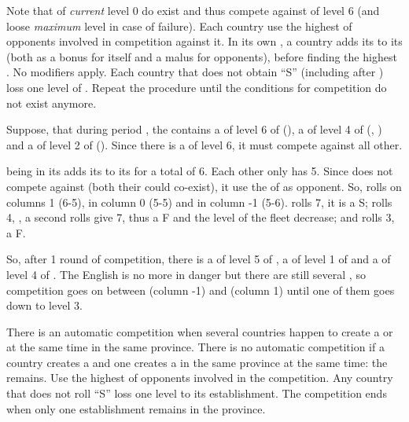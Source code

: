 
\bparag Note that \TradeFLEET of \emph{current} level 0 do exist and thus
compete against \TradeFLEET of level 6 (and loose \emph{maximum} level in case
of failure).
\bparag Each country use the highest \FTI of opponents involved in competition
against it.
\bparag In its own \CTZ, a country adds its \DTI to its \FTI (both as a bonus
for itself and a malus for opponents), before finding the highest \FTI.
\bparag No modifiers apply.
\bparag Each country that does not obtain ``S'' (including after \undemi) loss
one level of \TradeFLEET.
\bparag Repeat the procedure until the conditions for competition do not exist
anymore.

\begin{exemple}
  Suppose, that during period , the  contains a
  \TradeFLEET of level 6 of \HOL (), a \TradeFLEET of level 4 of \FRA
  (, ) and a \TradeFLEET of level 2 of \ANG (). Since there
  is a \TradeFLEET of level 6, it must compete against all other.

  \FRA being in its \CTZ adds its \DTI to its \FTI for a total of 6. Each
  other only has 5. Since \ANG does not compete against \FRA (both their
  \TradeFLEET could co-exist), it use the \FTI of \HOL as opponent. So, \FRA
  rolls on columns 1 (6-5), \ANG in column 0 (5-5) and \HOL in column -1
  (5-6). \FRA rolls 7, it is a S; \ANG rolls 4, \undemi, a second rolls give
  7, thus a F and the level of the fleet decrease; and \HOL rolls 3, a F.

  So, after 1 round of competition, there is a \TradeFLEET of level 5 of \HOL,
  a \TradeFLEET of level 1 of \ANG and a \TradeFLEET of level 4 of \FRA. The
  English \TradeFLEET is no more in danger but there are still several
  \TradeFLEET\Faceplus, so competition goes on between \HOL (column -1) and
  \FRA (column 1) until one of them goes down to level 3.
\end{exemple}

 There is an automatic competition when
several countries happen to create a \COL or \TP at the same time in the same
province.
\bparag There is no automatic competition if a country creates a \COL and one
creates a \TP in the same province at the same time: the \COL remains.
\bparag Use the highest \FTI of opponents involved in the competition.
\bparag Any country that does not roll ``S'' loss one level to its
establishment.
\bparag The competition ends when only one establishment remains in the
province.


